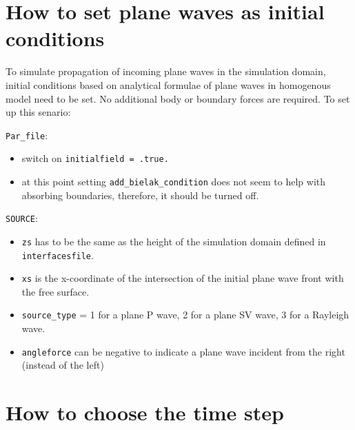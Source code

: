 \documentclass[oneside,english,onecolumn,letterpaper]{book}
\begin{document}
\section{How to set plane waves as initial conditions}
To simulate propagation of incoming plane waves in the simulation domain, initial conditions based on analytical formulae of plane waves in homogenous model need to be set. No additional body or boundary forces are required. To set up this senario:
\begin{description}
\item{\verb+Par_file+:}
  \begin{itemize}
  \item switch on \verb+initialfield = .true. +
  \item at this point setting \verb+add_bielak_condition+ does not seem to help with absorbing boundaries, therefore, it should be turned off.
  \end{itemize}
\item{\verb+SOURCE+:}
  \begin{itemize}
  \item \verb+zs+ has to be the same as the height of the simulation domain defined in \verb+interfacesfile+.
  \item \verb+xs+ is the x-coordinate of the intersection of the initial plane wave front with the free surface.
  \item \verb+source_type+ = 1 for a plane P wave, 2 for a plane SV wave, 3 for a Rayleigh wave.
  \item \verb+angleforce+ can be negative to indicate a plane wave incident from the right (instead of the left)
  \end{itemize}
\end{description}

\section{How to choose the time step}
\end{document}
